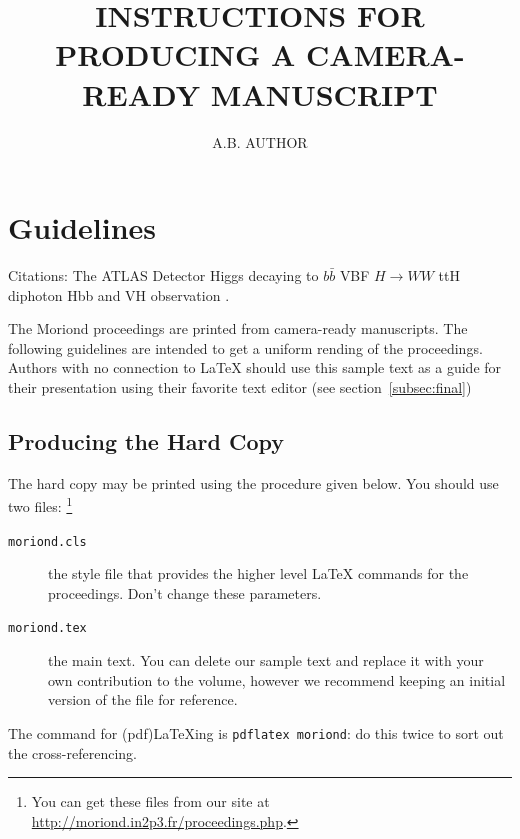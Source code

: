 \documentclass{moriond}
\begin{document}
\linenumbers

\vspace*{4cm}
\title{INSTRUCTIONS FOR PRODUCING A CAMERA-READY MANUSCRIPT}


\author{ A.B. AUTHOR }

\address{Department of Physics, Theoretical Physics, 1 Keble Road,\\
Oxford OX1 3NP, England}

\maketitle{}

\section{Guidelines}


Citations:
The ATLAS Detector \cite{PERF-2007-01}
Higgs decaying to $b\bar b$ \cite{HIGG-2018-50}
VBF $H{\rightarrow}WW$ \cite{HIGG-2017-14}
ttH diphoton \cite{ATLAS-CONF-2019-004}
Hbb and VH observation \cite{HIGG-2018-04}.

The Moriond proceedings are printed from camera-ready manuscripts.
The following guidelines are intended to get a uniform rending of the 
proceedings. Authors with no connection to \LaTeX{} should use this
sample text as a guide for their presentation using their favorite
text editor (see section~\ref{subsec:final})

\subsection{Producing the Hard Copy}\label{subsec:prod}

The hard copy may be printed using the procedure given below.
You should use
two files: \footnote{You can get these files from
our site at \url{http://moriond.in2p3.fr/proceedings.php}.}
\begin{description}
\item[\texttt{moriond.cls}] the style file that provides the higher
level \LaTeX{} commands for the proceedings. Don't change these parameters.
\item[\texttt{moriond.tex}] the main text. You can delete our sample
text and replace it with your own contribution to the volume, however we
recommend keeping an initial version of the file for reference.
\end{description}
The command for (pdf)\LaTeX ing is \texttt{pdflatex moriond}: do this twice to
sort out the cross-referencing.
\end{document}
